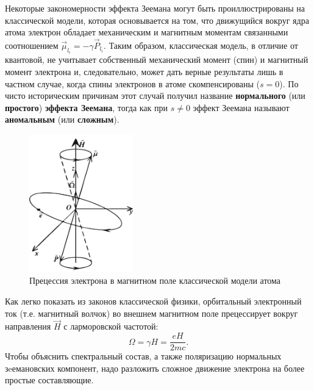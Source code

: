 
Некоторые закономерности эффекта Зеемана могут быть проиллюстрированы на классической модели, которая основывается на том, что движущийся вокруг ядра атома электрон обладает механическим и магнитным моментам связанными соотношением $\vec{\mu}_{l_i}=-\gamma \vec{P}_{l_i}$. Таким образом, классическая модель, в отличие от квантовой, не учитывает собственный механический момент (спин) и магнитный момент электрона и, следовательно, может дать верные результаты лишь в частном случае, когда спины электронов в атоме скомпенсированы ($s=0$). По чисто историческим причинам этот случай получил название \textbf{нормального} (или \textbf{простого}) \textbf{эффекта Зеемана}, тогда как при \textbf{$s\ne0$} эффект Зеемана называют \textbf{аномальным} (или \textbf{сложным}). 

\begin{figure}
\begin{center}
\vspace{-50pt}
\includegraphics[width=0.4\textwidth]{fig/fig4.jpg}
\vspace{-45pt}
\end{center}
\caption{Прецессия электрона в магнитном поле классической модели атома}
\label{fig:4}
\end{figure}

Как легко показать из законов классической физики, орбитальный электронный ток (т.е. магнитный волчок) во внешнем магнитном поле прецессирует вокруг направления $\vec{H}$ с ларморовской частотой: 
\begin{equation}
	\Omega=\gamma H=\frac{eH}{2mc}.
\end{equation} 
Чтобы объяснить спектральный состав, а также поляризацию нормальных зeемановских компонент, надо разложить сложное движение электрона на более простые составляющие.

